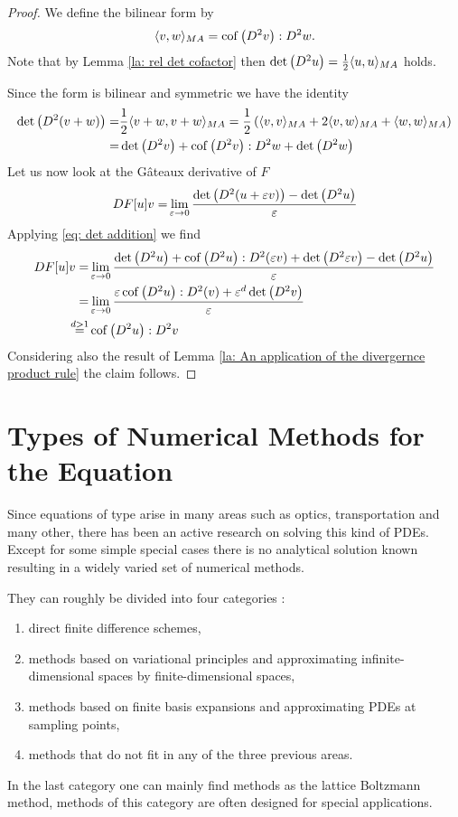 	\begin{proof}
	We define the \MA bilinear form by
	\[
	 \langle v, w \rangle_{MA} = \operatorname{cof} \left( D^2 v \right):D^2w.
	\]
	Note that by Lemma \ref{la: rel det cofactor} then $\det{\left(D^2 u\right)} = \frac 1 2  \langle u, u \rangle_{MA}$ holds.
	
	Since the \MA form is bilinear and symmetric we have the identity
	\begin{align}
		\det{\left(D^2 (v+w)\right)} =& \frac 1 2  \langle v+w, v+w \rangle_{MA} = \frac 1 2 \left( \langle v, v \rangle_{MA} + 2  \langle v, w \rangle_{MA} +  \langle w, w \rangle_{MA} \right) \nonumber\\
		=&  \det{\left(D^2 v\right)}  + \operatorname{cof} \left( D^2 v \right) : D^2 w + \det{\left(D^2 w\right)} \label{eq: det addition}
	\end{align}
	 Let us now look at the G\^ateaux derivative of $F$
		\begin{align*}
			DF[u]v =& \lim\limits_{\varepsilon \rightarrow 0} \frac { \det{\left(D^2(u+\varepsilon v)\right)} - \det{\left(D^2u\right)}}\varepsilon\\
			\end{align*}
Applying \eqref{eq: det addition} we find
		\begin{align*}
			DF[u]v =& \lim\limits_{\varepsilon \rightarrow 0} 
										\frac  {\det{\left(D^2 u\right)} + \operatorname{cof} \left( D^2 u \right) : D^2(\varepsilon v) + \det{\left(D^2 \varepsilon v\right)} - \det{\left(D^2 u\right)}}
													\varepsilon\\ 
			 =& \lim\limits_{\varepsilon \rightarrow 0} 
										\frac  {\varepsilon \operatorname{cof} \left( D^2 u \right) : D^2(v) + \varepsilon^d \det{\left(D^2 v\right)}}
													\varepsilon\\ 
			\stackrel{d > 1} =& \operatorname{cof} \left( D^2 u \right):D^2v
		\end{align*}
Considering also the result of Lemma \ref{la: An application of the divergernce product rule} the claim follows.
	\end{proof}	


\section{Types of Numerical Methods for the \MA Equation}
Since equations of \MA type arise in many areas such as optics, transportation and many other, there has been an active research on solving this kind of PDEs. Except for some simple special cases there is no analytical solution known resulting in a widely varied set of numerical methods.

They can roughly be divided into four categories \cite[p.210]{FGN2013}: 
\begin{enumerate}
	\item direct finite difference schemes,
	\item methods based on variational principles and approximating infinite-dimensional spaces by finite-dimensional spaces,
	\item methods based on finite basis expansions and approximating PDEs at sampling points,
	\item methods that do not fit in any of the three previous areas.
\end{enumerate}
In the last category one can mainly find methods as the lattice Boltzmann method, methods of this category are often designed for special applications.

